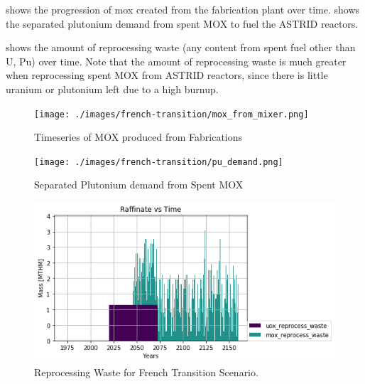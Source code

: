  shows the progression of mox created from
the fabrication plant over time.  shows
the separated plutonium demand from spent \gls{MOX} to fuel the 
ASTRID reactors.

 shows the amount of reprocessing waste
(any content from spent fuel other than U, Pu) over time. Note that 
the amount of reprocessing waste is much greater when reprocessing
spent \gls{MOX} from ASTRID reactors, since there is little uranium
or plutonium left due to a high burnup.

\begin{figure}[htbp!]
	\begin{center}
		\texttt{[image: ./images/french-transition/mox\_from\_mixer.png]}
	\end{center}
	\caption{Timeseries of MOX produced from Fabrications}
	\label{fig:mox_fab}
\end{figure}


\begin{figure}[htbp!]
	\begin{center}
		\texttt{[image: ./images/french-transition/pu\_demand.png]}
	\end{center}
	\caption{Separated Plutonium demand from Spent MOX}
	\label{fig:pu_demand_mox}
\end{figure}

\begin{figure}[htbp!]
	\begin{center}
		\includegraphics[scale=0.7]{./images/french-transition/reprocess_waste.png}
	\end{center}
	\caption{Reprocessing Waste for French Transition Scenario.}
	\label{fig:reprocess_waste}
\end{figure}


